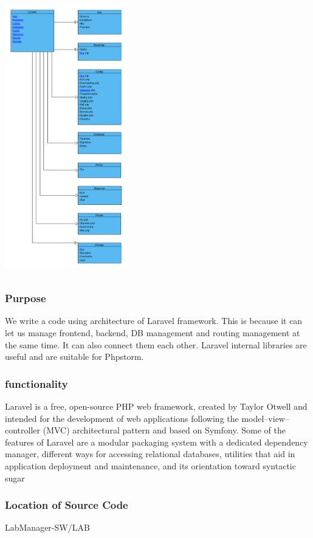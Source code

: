 \documentclass[letterpaper, 10 pt, conference]{ieeeconf}  %
\begin{document}
\includegraphics[width=0.4\textwidth,height = 12cm]{bibliographies/image/Laravel.png}
\subsubsection{Purpose}
We write a code using architecture of Laravel framework. This is because it can let us manage frontend, backend, DB management and routing management at the same time. It can also connect them each other. Laravel internal libraries are useful and are suitable for Phpstorm.

\subsubsection{functionality}
Laravel is a free, open-source PHP web framework, created by Taylor Otwell and intended for the development of web applications following the model–view–controller (MVC) architectural pattern and based on Symfony. Some of the features of Laravel are a modular packaging system with a dedicated dependency manager, different ways for accessing relational databases, utilities that aid in application deployment and maintenance, and its orientation toward syntactic sugar

\subsubsection{Location of Source Code}
LabManager-SW/LAB
\end{document}
